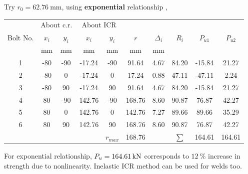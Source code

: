 \begin{solution}
Try $r_0=\SI{62.76}{\mm}$, using \textbf{exponential} relationship ,
\begin{table}[H]
\centering
\begin{tabular}{cccccccccc}
	\toprule
	         & \multicolumn{2}{c}{About c.r.} & \multicolumn{2}{c}{About ICR} &          &            &          &          &          \\
	Bolt No. &  $x_i$   &        $y_i$        &  $x_i$   &       $y_i$        &   $r$    & $\Delta_i$ &  $R_i$   & $P_{u1}$ & $P_{u2}$ \\
	         & \si{\mm} &      \si{\mm}       & \si{\mm} &      \si{\mm}      & \si{\mm} &  \si{\mm}  & \si{\kn} & \si{\kn} & \si{\kn} \\ \midrule
	   1     &   -80    &         -90         &  -17.24  &        -90         &  91.64   &    4.67    &  84.20   &  -15.84  &  21.27   \\
	   2     &   -80    &          0          &  -17.24  &         0          &  17.24   &    0.88    &  47.11   &  -47.11  &   2.24   \\
	   3     &   -80    &         90          &  -17.24  &         90         &  91.64   &    4.67    &  84.20   &  -15.84  &  21.27   \\
	   4     &    80    &         -90         &  142.76  &        -90         &  168.76  &    8.60    &  90.87   &  76.87   &  42.27   \\
	   5     &    80    &          0          &  142.76  &         0          &  142.76  &    7.27    &  89.66   &  89.66   &  35.29   \\
	   6     &    80    &         90          &  142.76  &         90         &  168.76  &    8.60    &  90.87   &  76.87   &  42.27   \\ \bottomrule
	         &          &                     &          &     $r_{max}$      &  168.76  &            &  $\sum$  &  164.61  &  164.61
\end{tabular}
\end{table}

For exponential relationship, $P_u=\SI{164.61}{\kilo\newton}$ corresponds to $\SI{12}{\percent}$ increase in strength due to nonlinearity. Inelastic ICR method can be used for welds too.
\end{solution}

